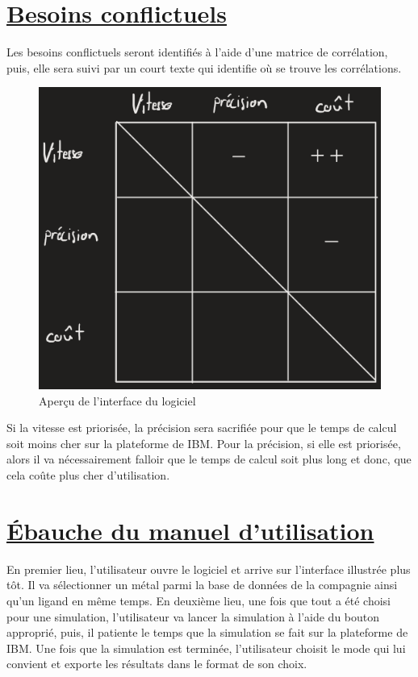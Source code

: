 \documentclass[11pt]{article}
\begin{document}
\section{\underline{Besoins conflictuels}}
Les besoins conflictuels seront identifiés à l'aide d'une matrice de corrélation, puis, elle sera suivi par un court texte qui identifie où se trouve les corrélations.

\begin{figure}[h!]
  \centering
  \includegraphics[scale=0.5]{matriceCorrelation.png}
  \caption{Aperçu de l'interface du logiciel}
\end{figure}
Si la vitesse est priorisée, la précision sera sacrifiée pour que le temps de calcul soit moins cher sur la plateforme de IBM. Pour la précision, si elle est priorisée, alors il va nécessairement falloir que le temps de calcul soit plus long et donc, que cela coûte plus cher d'utilisation.
\pagebreak


\section{\underline{Ébauche du manuel d'utilisation}}
En premier lieu, l'utilisateur ouvre le logiciel et arrive sur l'interface illustrée plus tôt. Il va sélectionner un métal parmi la base de données de la compagnie ainsi qu'un ligand en même temps. En deuxième lieu, une fois que tout a été choisi pour une simulation, l'utilisateur va lancer la simulation à l'aide du bouton approprié, puis, il patiente le temps que la simulation se fait sur la plateforme de IBM. Une fois que la simulation est terminée, l'utilisateur choisit le mode qui lui convient et exporte les résultats dans le format de son choix.
\end{document}
